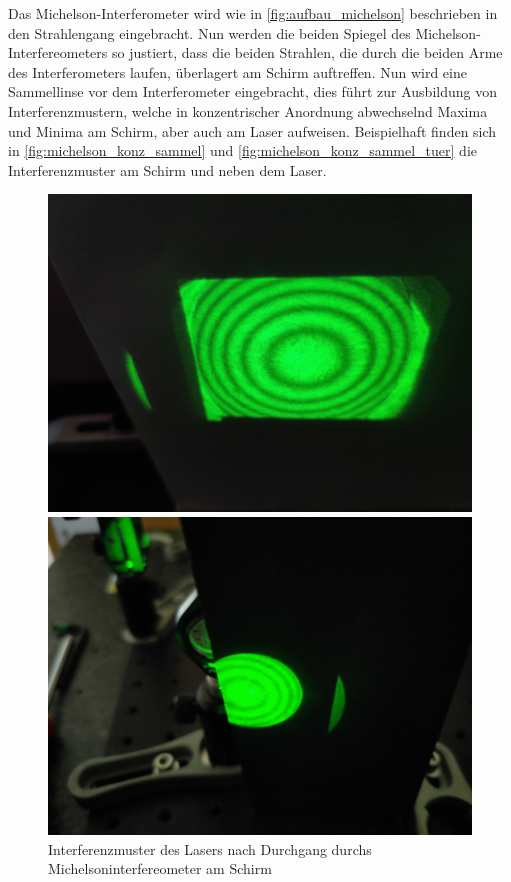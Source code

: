 \documentclass[ngerman]{scrartcl}
\begin{document}
Das Michelson-Interferometer wird wie in \autoref{fig:aufbau_michelson} beschrieben in den Strahlengang eingebracht. Nun werden die beiden Spiegel des Michelson-Interfereometers so justiert, dass die beiden Strahlen, die durch die beiden Arme des Interferometers laufen, überlagert am Schirm auftreffen. Nun wird eine Sammellinse vor dem Interferometer eingebracht, dies führt zur Ausbildung von Interferenzmustern, welche in konzentrischer Anordnung abwechselnd Maxima und Minima am Schirm, aber auch am Laser aufweisen. Beispielhaft finden sich in \autoref{fig:michelson_konz_sammel} und \autoref{fig:michelson_konz_sammel_tuer} die Interferenzmuster am Schirm und neben dem Laser.

\setcapindent{0pt}
\begin{figure}[H]
    \centering
    \begin{minipage}[t]{0.45\linewidth}
        \centering
        \includegraphics[width=\linewidth]{fig/Compressed/michelson_konz_schirm.jpg}
        \caption{Interferenzmuster des Lasers nach Durchgang durchs Michelsoninterfereometer am Schirm}
        \label{fig:michelson_konz_sammel}
    \end{minipage}%
    \hspace*{\fill}
    \begin{minipage}[t]{0.45\linewidth}
        \centering
        \includegraphics[width=\linewidth]{fig/Compressed/michelson_konz_tuer.jpg}

\end{minipage}
\end{figure}
\end{document}
